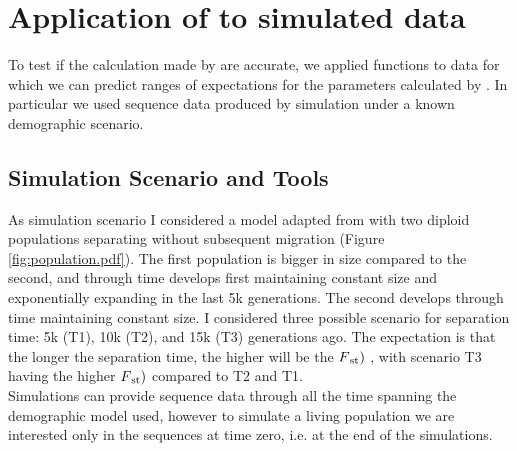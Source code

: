 \section{Application of \vgp to simulated data}
To test if the calculation made by \vgp are accurate, we applied \vgp functions to data for which we can predict ranges of expectations for the parameters calculated by \vgp. In particular we used sequence data produced by simulation under a known demographic scenario. 




\subsection{Simulation Scenario and Tools}

As simulation scenario I considered a model adapted from \cite{hudson2004ms} with two diploid populations separating without subsequent migration (Figure \ref{fig:population.pdf}). The first population is bigger in size compared to the second, and through time develops first maintaining constant size and exponentially expanding in the last 5k generations. The second develops through time maintaining constant size. I considered three possible scenario for separation time: 5k (T1), 10k (T2), and 15k (T3) generations ago. The expectation is that the longer the separation time, the higher will be the $F\textsubscript{st})$ , with scenario T3 having the higher $F\textsubscript{st})$ compared to T2 and T1. \\

Simulations can provide sequence data through all the time spanning the demographic model used, however to simulate a living population we are interested only in the sequences at time zero, i.e. at the end of the simulations.\\

